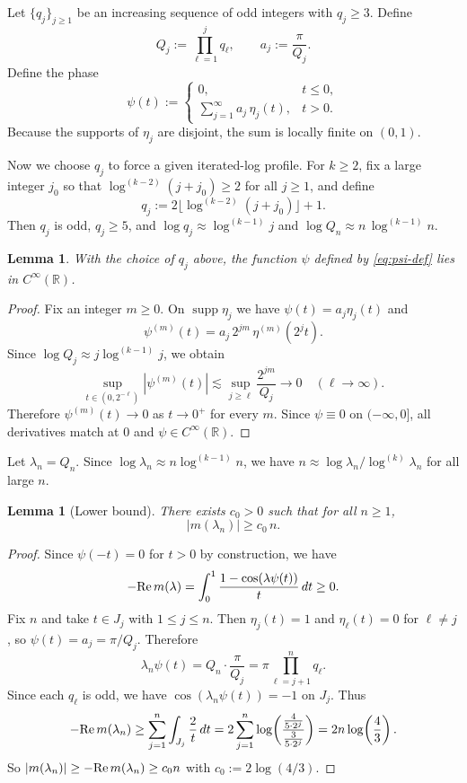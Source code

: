\documentclass[11pt]{amsart}
\newtheorem{lemma}[theorem]{Lemma}
\renewcommand{\Re}{ {\rm Re}\,}
\newcommand{\1}{{\rm 1\hspace*{-0.4ex}%
			\rule{0.1ex}{1.52ex}\hspace*{0.2ex}}}
\numberwithin{equation}{section}
\newcommand{\logit}[1]{\log^{(#1)}}
\begin{document}
Let $\{q_j\}_{j\ge 1}$ be an increasing sequence of odd integers with $q_j\ge 3$.
Define
\[
Q_j:=\prod_{\ell=1}^j q_\ell,
\qquad
a_j:=\frac{\pi}{Q_j}.
\]
Define the phase
\begin{equation}\label{eq:psi-def}
	\psi(t):=
	\begin{cases}
		0, & t\le 0,\\[4pt]
		\displaystyle \sum_{j=1}^\infty a_j\,\eta_j(t), & t>0.
	\end{cases}
\end{equation}
Because the supports of $\eta_j$ are disjoint, the sum is locally finite on $(0,1)$.

Now we choose $q_j$ to force a given iterated-log profile. For $k\ge 2$, fix a large integer $j_0$ so that $\logit{k-2}(j+j_0)\ge 2$ for all $j\ge 1$, and define
	\begin{equation}\label{eq:qj-choice}
		q_j:=2\Big\lfloor \logit{k-2}(j+j_0)\Big\rfloor+1.
	\end{equation}
	Then $q_j$ is odd, $q_j\ge 5$, and
$\log q_j \approx \logit{k-1} j$ and $\log Q_n \approx
	n\,\logit{k-1} n$. 

\begin{lemma}\label{lem:smooth}
	With the choice of $q_j$ above,
	the function $\psi$ defined by \eqref{eq:psi-def} lies in $C^\infty(\mathbb R)$.
\end{lemma}

\begin{proof}
	Fix an integer $m\ge 0$.
	On $\operatorname{supp}\eta_j$ we have $\psi(t)=a_j\eta_j(t)$ and
	\[
	\psi^{(m)}(t)=a_j\,2^{jm}\,\eta^{(m)}(2^j t).
	\]
Since $\log Q_j\approx j\log^{(k-1)}j$, we obtain
	\[
	\sup_{t\in(0,2^{-\ell})}|\psi^{(m)}(t)|
	\lesssim \sup_{j\ge \ell}\frac{2^{jm}}{Q_j}\to 0\quad (\ell \to\infty).
	\]
	Therefore $\psi^{(m)}(t)\to 0$ as $t\to 0^+$ for every $m$.
	Since $\psi\equiv 0$ on $(-\infty,0]$, all derivatives match at $0$ and
	$\psi\in C^\infty(\mathbb R)$.
\end{proof}

Let $\lambda_n=Q_n$. Since $\log \lambda_n\approx n\log^{(k-1)}n$, we have $n\approx \log \lambda_n/\log^{(k)}\lambda_n$ for all large $n$.

\begin{lemma}[Lower bound]\label{lem:lower}
	There exists $c_0>0$ such that for all $n\ge 1$,
	\[
	|m(\lambda_n)|\ge c_0\,n.
	\]
\end{lemma}

\begin{proof}
Since $\psi(-t)=0$ for $t>0$ by construction, we have
	\[
	-\Re m(\lambda)=\int_0^1 \frac{1-\cos(\lambda\psi(t))}{t}\,dt\ge 0.
	\]
	Fix $n$ and take $t\in J_j$ with $1\le j\le n$. Then $\eta_j(t)=1$ and
	$\eta_\ell(t)=0$ for $\ell\neq j$, so $\psi(t)=a_j=\pi/Q_j$.
	Therefore
	\[
	\lambda_n\psi(t)=Q_n\cdot\frac{\pi}{Q_j}
	=\pi\prod_{\ell=j+1}^n q_\ell.
	\]
	Since each $q_\ell$ is odd, we have
	$\cos(\lambda_n\psi(t))=-1$ on $J_j$.
	Thus
	\[
	-\Re m(\lambda_n)
	\ge \sum_{j=1}^n \int_{J_j}\frac{2}{t}\,dt
	=2\sum_{j=1}^n \log\!\left(\frac{ \frac{4}{5\cdot 2^j} }{ \frac{3}{5\cdot 2^j} }\right)
	=2n\log\!\left(\frac43\right).
	\]
	So $|m(\lambda_n)|\ge -\Re m(\lambda_n)\ge c_0 n$ with $c_0:=2\log(4/3)$.
\end{proof}
\end{document}
